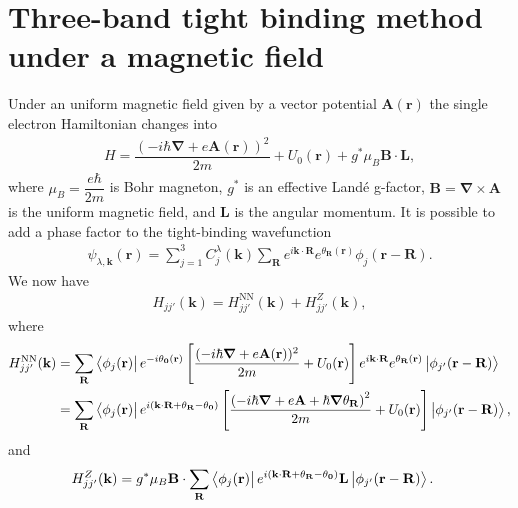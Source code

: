 \documentclass{report}
\newcommand{\f}[2]{\dfrac{#1}{#2}}
\begin{document}
\section{Three-band tight binding method under a magnetic field}\label{Section 2.2}
Under an uniform magnetic field given by a vector potential $\mathbf{A}(\mathbf{r})$ the single electron Hamiltonian changes into
\begin{gather}
	H = \f{\left(-i\hbar \boldsymbol{\nabla} + e \mathbf{A(r)}\right)^{2}}{2m} + U_{0}(\mathbf{r}) + g^{*} \mu_{B} \mathbf{B} \cdot \mathbf{L},
\end{gather}
where $\mu_{B} = \f{e\hbar}{2m}$ is Bohr magneton, $g^{*}$ is an effective Landé g-factor, $\mathbf{B} = \boldsymbol{\nabla} \times  \mathbf{A}$ is the uniform magnetic field, and $\mathbf{L}$ is the angular momentum. It is possible to add a phase factor to the tight-binding wavefunction
\begin{gather}
	\psi_{\lambda,\mathbf{k}} (\mathbf{r}) = \sum_{j=1}^{3} C_{j}^{\lambda}(\mathbf{k}) \sum_{\mathbf{R}} e^{i\mathbf{k \cdot R}} e^{ \theta_{\mathbf{R}}(\mathbf{r})} \phi_{j}(\mathbf{r} - \mathbf{R}).
\end{gather}
We now have
\begin{equation}
	\begin{aligned}
		H_{j j'} (\mathbf{k}) = H_{jj'}^{\text{NN}}(\mathbf{k}) + H_{jj'}^{Z}(\mathbf{k}),
	\end{aligned}
\end{equation}
where
\begin{equation}
	\begin{aligned}
		H_{jj'}^{\text{NN}}(\mathbf{k})
		 & = \sum_{\mathbf{R}} \bra{\phi_{j}(\mathbf{r})} e^{-i \theta_{\mathbf{0}}(\mathbf{r})} \left[\f{(-i\hbar \boldsymbol{\nabla} + e \mathbf{A}(\mathbf{r}))^{2}}{2m} + U_{0}(\mathbf{r}) \right] e^{i\mathbf{k \cdot R}} e^{ \theta_{\mathbf{R}}(\mathbf{r})} \ket{\phi_{j'}(\mathbf{r - R})}                        \\
		 & = \sum_{\mathbf{R}} \bra{\phi_{j}(\mathbf{r})} e^{i(\mathbf{k \cdot R} +\theta_{\mathbf{R}} - \theta_{\mathbf{0}} )} \left[ \f{ \left( -i\hbar \boldsymbol{\nabla} + e \mathbf{A} + \hbar \boldsymbol{\nabla} \theta_{\mathbf{R}} \right)^{2} }{2m} + U_{0}(\mathbf{r}) \right] \ket{\phi_{j'}(\mathbf{r - R})},
	\end{aligned}
\end{equation}
and
\begin{align}
	H_{jj'}^{Z}(\mathbf{k})
	 & = g^{*} \mu_{B} \mathbf{B} \cdot \sum_{\mathbf{R}} \bra{\phi_{j}(\mathbf{r})} e^{i(\mathbf{k \cdot R} + \theta_{\mathbf{R}} - \theta_{\mathbf{0}} )} \mathbf{L} \ket{\phi_{j'}(\mathbf{r - R})}.
\end{align}
\end{document}
